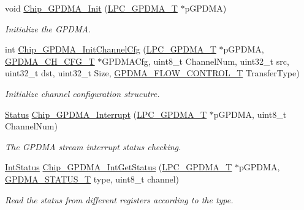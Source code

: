 \begin{DoxyCompactItemize}
void \hyperlink{group__GPDMA__17XX__40XX_ga21c99277e4579af4be9d9311a03b5542}{Chip\+\_\+\+G\+P\+D\+M\+A\+\_\+\+Init} (\hyperlink{structLPC__GPDMA__T}{L\+P\+C\+\_\+\+G\+P\+D\+M\+A\+\_\+T} $\ast$p\+G\+P\+D\+MA)
\begin{DoxyCompactList}\small\item\em Initialize the G\+P\+D\+MA. \end{DoxyCompactList}\item 
int \hyperlink{group__GPDMA__17XX__40XX_gac32ac477dbee2d3be93ca90b30db856c}{Chip\+\_\+\+G\+P\+D\+M\+A\+\_\+\+Init\+Channel\+Cfg} (\hyperlink{structLPC__GPDMA__T}{L\+P\+C\+\_\+\+G\+P\+D\+M\+A\+\_\+T} $\ast$p\+G\+P\+D\+MA, \hyperlink{structGPDMA__CH__CFG__T}{G\+P\+D\+M\+A\+\_\+\+C\+H\+\_\+\+C\+F\+G\+\_\+T} $\ast$G\+P\+D\+M\+A\+Cfg, uint8\+\_\+t Channel\+Num, uint32\+\_\+t src, uint32\+\_\+t dst, uint32\+\_\+t Size, \hyperlink{group__GPDMA__17XX__40XX_ga2cb59b641cd840f22780c44be1208133}{G\+P\+D\+M\+A\+\_\+\+F\+L\+O\+W\+\_\+\+C\+O\+N\+T\+R\+O\+L\+\_\+T} Transfer\+Type)
\begin{DoxyCompactList}\small\item\em Initialize channel configuration strucutre. \end{DoxyCompactList}\item 
\hyperlink{group__LPC__Types__Public__Types_ga67a0db04d321a74b7e7fcfd3f1a3f70b}{Status} \hyperlink{group__GPDMA__17XX__40XX_ga986bb4a0d10a05ff6284fff871fb86c6}{Chip\+\_\+\+G\+P\+D\+M\+A\+\_\+\+Interrupt} (\hyperlink{structLPC__GPDMA__T}{L\+P\+C\+\_\+\+G\+P\+D\+M\+A\+\_\+T} $\ast$p\+G\+P\+D\+MA, uint8\+\_\+t Channel\+Num)
\begin{DoxyCompactList}\small\item\em The G\+P\+D\+MA stream interrupt status checking. \end{DoxyCompactList}\item 
\hyperlink{group__LPC__Types__Public__Types_gab7d263072f745b4f3913fb0afc434c4e}{Int\+Status} \hyperlink{group__GPDMA__17XX__40XX_ga06fdae68a49436b9a02d42ad85782ff4}{Chip\+\_\+\+G\+P\+D\+M\+A\+\_\+\+Int\+Get\+Status} (\hyperlink{structLPC__GPDMA__T}{L\+P\+C\+\_\+\+G\+P\+D\+M\+A\+\_\+T} $\ast$p\+G\+P\+D\+MA, \hyperlink{group__GPDMA__17XX__40XX_ga2f4aa97bd0ffa5046c8e2b17028d99cc}{G\+P\+D\+M\+A\+\_\+\+S\+T\+A\+T\+U\+S\+\_\+T} type, uint8\+\_\+t channel)
\begin{DoxyCompactList}\small\item\em Read the status from different registers according to the type. \end{DoxyCompactList}\item 

\end{DoxyCompactItemize}
